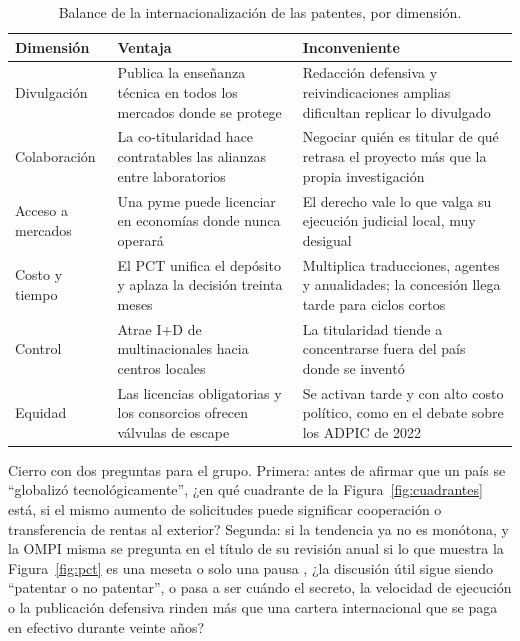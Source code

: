 \documentclass[11pt,letterpaper]{article}
\begin{document}
\begin{table}[ht]
  \centering
  \small
  \caption{Balance de la internacionalización de las patentes, por dimensión.}
  \label{tab:balance}
  \begin{tabularx}{\textwidth}{@{}>{\raggedright\arraybackslash}p{}
    >{\raggedright\arraybackslash}X >{\raggedright\arraybackslash}X@{}}
    \toprule
    \textbf{Dimensión} & \textbf{Ventaja} & \textbf{Inconveniente} \\
    \midrule
    Divulgación
      & Publica la enseñanza técnica en todos los mercados donde se protege
      & Redacción defensiva y reivindicaciones amplias dificultan replicar lo
        divulgado \\
    Colaboración
      & La co-titularidad hace contratables las alianzas entre laboratorios
      & Negociar quién es titular de qué retrasa el proyecto más que la propia
        investigación \\
    Acceso a mercados
      & Una pyme puede licenciar en economías donde nunca operará
      & El derecho vale lo que valga su ejecución judicial local, muy desigual \\
    Costo y tiempo
      & El PCT unifica el depósito y aplaza la decisión treinta meses
      & Multiplica traducciones, agentes y anualidades; la concesión llega tarde
        para ciclos cortos \\
    Control
      & Atrae I+D de multinacionales hacia centros locales
      & La titularidad tiende a concentrarse fuera del país donde se inventó \\
    Equidad
      & Las licencias obligatorias y los consorcios ofrecen válvulas de escape
      & Se activan tarde y con alto costo político, como en el debate sobre los
        ADPIC de 2022 \parencite{wto2022} \\
    \bottomrule
  \end{tabularx}
\end{table}

Cierro con dos preguntas para el grupo. Primera: antes de afirmar que un país se
\enquote{globalizó tecnológicamente}, ¿en qué cuadrante de la
Figura~\ref{fig:cuadrantes} está, si el mismo aumento de solicitudes puede
significar cooperación o transferencia de rentas al exterior? Segunda: si la
tendencia ya no es monótona, y la OMPI misma se pregunta en el título de su
revisión anual si lo que muestra la Figura~\ref{fig:pct} es una meseta o solo
una pausa \parencite{wipo2025pct}, ¿la discusión útil sigue siendo \enquote{patentar o no patentar}, o pasa a ser
cuándo el secreto, la velocidad de ejecución o la publicación defensiva rinden
más que una cartera internacional que se paga en efectivo durante veinte años?

\printbibliography[title={Referencias bibliográficas}]
\end{document}
